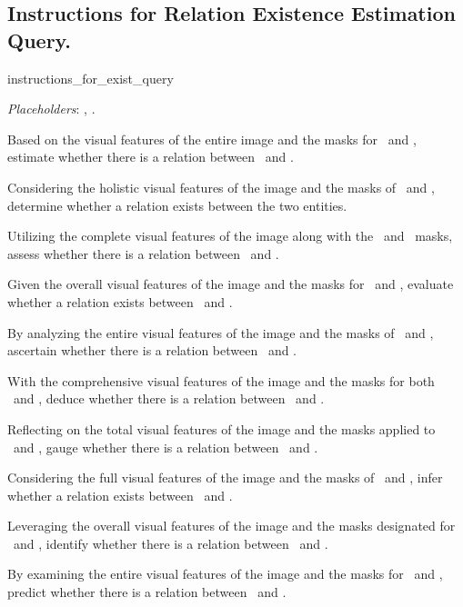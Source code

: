 \subsection{Instructions for Relation Existence Estimation Query.}

\begin{instructionbox}{instructions\_for\_exist\_query}
\small
\raggedright
\noindent \textit{Placeholders}: \instsubject, \instobject.
\begin{instructionitems}
\item Based on the visual features of the entire image and the masks for \instsubject\ and \instobject, estimate whether there is a relation between \instsubject\ and \instobject.
\item Considering the holistic visual features of the image and the masks of \instsubject\ and \instobject, determine whether a relation exists between the two entities.
\item Utilizing the complete visual features of the image along with the \instsubject\ and \instobject\ masks, assess whether there is a relation between \instsubject\ and \instobject.
\item Given the overall visual features of the image and the masks for \instsubject\ and \instobject, evaluate whether a relation exists between \instsubject\ and \instobject.
\item By analyzing the entire visual features of the image and the masks of \instsubject\ and \instobject, ascertain whether there is a relation between \instsubject\ and \instobject.
\item With the comprehensive visual features of the image and the masks for both \instsubject\ and \instobject, deduce whether there is a relation between \instsubject\ and \instobject.
\item Reflecting on the total visual features of the image and the masks applied to \instsubject\ and \instobject, gauge whether there is a relation between \instsubject\ and \instobject.
\item Considering the full visual features of the image and the masks of \instsubject\ and \instobject, infer whether a relation exists between \instsubject\ and \instobject.
\item Leveraging the overall visual features of the image and the masks designated for \instsubject\ and \instobject, identify whether there is a relation between \instsubject\ and \instobject.
\item By examining the entire visual features of the image and the masks for \instsubject\ and \instobject, predict whether there is a relation between \instsubject\ and \instobject.
\end{instructionitems}
\end{instructionbox}


